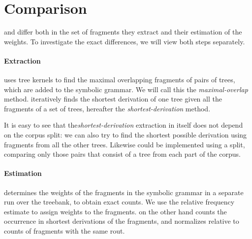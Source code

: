
\section{Comparison} \label{sec:Comparison}
\dops{} and \ddop{} differ both in the set of fragments they extract and their estimation of the weights. To investigate the exact differences, we will view both steps separately.


\paragraph{Extraction}
\ddop{} uses tree kernels to find the maximal overlapping fragments of pairs of trees, which are added to the symbolic grammar. We will call this the \emph{maximal-overlap} method. \dops{} iteratively finds the shortest derivation of one tree given all the fragments of a set of trees, hereafter the \emph{shortest-derivation} method. 

It is easy to see that the\emph{shortest-derivation} extraction in itself does not depend on the corpus split: we can also try to find the shortest possible derivation using fragments from all the other trees. Likewise \ddop{} could be implemented using a split, comparing only those pairs that consist of a tree from each part of the corpus. 


\paragraph{Estimation}
\ddop{} determines the weights of the fragments in the symbolic grammar in a separate run over the treebank, to obtain exact counts. We use the relative frequency estimate to assign weights to the fragments. \dops{} on the other hand counts the occurrence in shortest derivations of the fragments, and normalizes relative to counts of fragments with the same rout.

